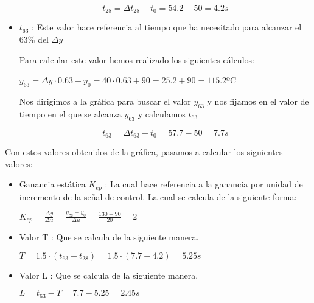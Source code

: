 \documentclass[11pt]{article}
\begin{document}
\begin{itemize}
    $$ t_{28} = \Delta t_{28} - t_{0} = 54.2 - 50 = 4.2s $$

    \item $t_{63}$ : Este valor hace referencia al tiempo que ha necesitado para alcanzar el 63\% del $\Delta y$

    Para calcular este valor hemos realizado los siguientes cálculos:\\
    \begin{center}
        $ y_{63} = \Delta y \cdot  0.63 + y_{0} = 40 \cdot 0.63 + 90 = 25.2 + 90 = 115.2$ºC
    \end{center}
     

    Nos dirigimos a la gráfica para buscar el valor $y_{63}$ y nos fijamos en el valor de tiempo en el que se alcanza $y_{63}$ y calculamos $t_{63}$

    $$ t_{63} = \Delta t_{63} - t_{0} = 57.7 - 50 = 7.7s $$
\end{itemize}

Con estos valores obtenidos de la gráfica, pasamos a calcular los siguientes valores:

\begin{itemize}
    \item Ganancia estática $K_{ep}$ : La cual hace referencia a la ganancia por unidad de incremento de la señal de control.
    La cual se calcula de la siguiente forma:
    \begin{center}
        $K_{ep} = \frac{\Delta y}{\Delta u} = \frac{y_{\infty} - y_{0}}{\Delta u} = \frac{130 - 90}{20} = 2$
    \end{center}
    
    \item Valor T : Que se calcula de la siguiente manera.
    \begin{center}
        $T = 1.5 \cdot (t_{63} - t_{28}) = 1.5 \cdot (7.7 - 4.2) = 5.25s$
    \end{center}


    \item Valor L : Que se calcula de la siguiente manera. 
    \begin{center}
        $L = t_{63} - T = 7.7 - 5.25 = 2.45s$
    \end{center}

    
\end{itemize}
\end{document}
